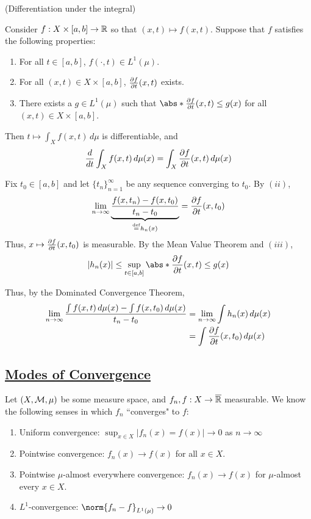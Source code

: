 \documentclass[x11names,reqno,14pt]{extarticle}
\newcommand*{\oo}{\infty}
\newcommand{\seq}[1]{_{#1 = 1}^\oo}
\newcommand{\barr}{{\bar{\R}}}
\begin{document}
\thm (Differentiation under the integral)

Consider $f:X\times[a, b]\to\mathbb{R}$ so that $(x, t)\mapsto f(x, t)$. Suppose that $f$ satisfies the following properties:
\begin{enumerate}[label=(\roman*)]
\item For all $t \in [a, b]$, $f(\cdot, t)\in L^1(\mu)$. 
\item For all $(x, t) \in X\times[a, b]$, $\frac{\partial f}{\partial t}(x, t)$ exists. 
\item There exists a $g\in L^1(\mu)$ such that $\abs*{\frac{\del f}{\del t}(x, t)} \leq g(x)$ for all $(x, t) \in X\times[a, b]$. 
\end{enumerate}
Then $t\mapsto \int_Xf(x, t)\,d\mu$ is differentiable, and 
\[
\frac{d}{dt}\int_Xf(x, t)\,d\mu(x) = \int_X\frac{\partial f}{\partial t}(x, t)\,d\mu(x)
\]

\proof

Fix $t_0 \in [a, b]$ and let $\{t_n\}\seq{n}$ be any sequence converging to $t_0$. By $(ii)$, 
\[
\lim_{n\to\oo}\underbrace{\frac{f(x, t_n) - f(x, t_0)}{t_n - t_0}}_{\eqdef h_n(x)} = \frac{\del f}{\del t}(x, t_0)
\]
Thus, $x\mapsto \frac{\partial f}{\partial t}(x, t_0)$ is measurable. By the Mean Value Theorem and $(iii)$, 
\[
|h_n(x)| \leq \sup_{t\in[a, b]}\abs*{\frac{\del f}{\del t}(x, t)} \leq g(x)
\]

Thus, by the Dominated Convergence Theorem, 
\begin{align*}
\lim_{n\to\oo}\frac{\int f(x, t)\,d\mu(x) - \int f(x, t_0)\,d\mu(x)}{t_n - t_0} & = \lim_{n\to\oo}\int h_n(x)\,d\mu(x)\\
& = \int\frac{\del f}{\del t}(x, t_0)\,d\mu(x) \\
\end{align*}

\subsection*{\underline{Modes of Convergence}}

Let $(X, \mathcal{M}, \mu)$ be some measure space, and $f_n, f:X\to\barr$ measurable. We know the following senses in which $f_n$ ``converges" to $f$:
\begin{enumerate}
\item Uniform convergence: $\sup_{x\in X}|f_n(x) = f(x)|\to 0$ as $n\to\oo$
\item Pointwise convergence: $f_n(x) \to f(x)$ for all $x \in X$. 
\item Pointwise $\mu$-almost everywhere convergence: $f_n(x)\to f(x)$ for $\mu$-almost every $x \in X$. 
\item $L^1$-convergence: $\norm{f_n - f}_{L^1(\mu)} \to 0$
\end{enumerate}
\end{document}
